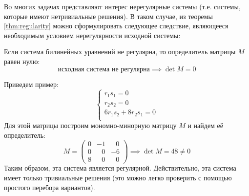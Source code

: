 Во многих задачах представляют интерес нерегулярные системы (т.е. системы, которые имеют 
нетривиальные решения). В таком случае, из теоремы \ref{thm:regularity} можно сформулировать следующее следствие, являющееся необходимым условием нерегулярности исходной системы:

\begin{consequence}
	Если система билинейных уравнений не регулярна, то определитель матрицы $M$ равен нулю:
	$$
	\text{исходная система не регулярна} \implies \det M = 0 
	$$
\end{consequence}

\noindent Приведем пример:
\begin{equation*}
	\begin{cases}
		r_1 s_1 = 0 \\
		r_2 s_2 = 0 \\
		6 r_1 s_2 + 8 r_2 s_1 = 0 \\
	\end{cases}
\end{equation*}
Для этой матрицы построим мономно-минорную матрицу $M$ и найдем её определитель:
$$
	M =
	\begin{pmatrix}
	0 & -1 & \;\;\,0 \\
	0 & \;\;\,0 & -6 \\
	8 & \;\;\,0 & \;\;\,0 
	\end{pmatrix}
	\implies 
	\det M = 48 \ne 0
$$
Таким образом, эта система является регулярной. Действительно, эта система имеет только тривиальные решения (это можно легко проверить с помощью простого перебора вариантов).

